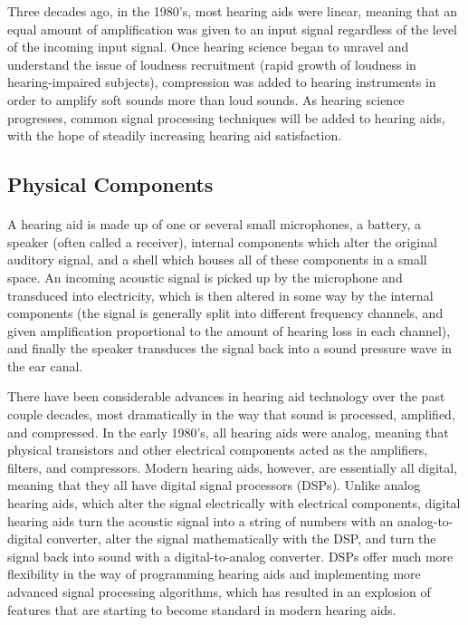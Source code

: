 Three decades ago, in the 1980's, most hearing aids were linear, meaning that an equal amount of amplification was given to an input signal regardless of the level of the incoming input signal.  Once hearing science began to unravel and understand the issue of loudness recruitment (rapid growth of loudness in hearing-impaired subjects), compression was added to hearing instruments in order to amplify soft sounds more than loud sounds.  As hearing science progresses, common signal processing techniques will be added to hearing aids, with the hope of steadily increasing hearing aid satisfaction.

\subsection{Physical Components}
\paragraph{}A hearing aid is made up of one or several small microphones, a battery, a speaker (often called a receiver), internal components which alter the original auditory signal, and a shell which houses all of these components in a small space.  An incoming acoustic signal is picked up by the microphone and transduced into electricity, which is then altered in some way by the internal components (the signal is generally split into different frequency channels, and given amplification proportional to the amount of hearing loss in each channel), and finally the speaker transduces the signal back into a sound pressure wave in the ear canal.

There have been considerable advances in hearing aid technology over the past couple decades, most dramatically in the way that sound is processed, amplified, and compressed.  In the early 1980's, all hearing aids were analog, meaning that physical transistors and other electrical components acted as the amplifiers, filters, and compressors.  Modern hearing aids, however, are essentially all digital, meaning that they all have digital signal processors (DSPs).  Unlike analog hearing aids, which alter the signal electrically with electrical components, digital hearing aids turn the acoustic signal into a string of numbers with an analog-to-digital converter, alter the signal mathematically with the DSP, and turn the signal back into sound with a digital-to-analog converter.  DSPs offer much more flexibility in the way of programming hearing aids and implementing more advanced signal processing algorithms, which has resulted in an explosion of features that are starting to become standard in modern hearing aids.

